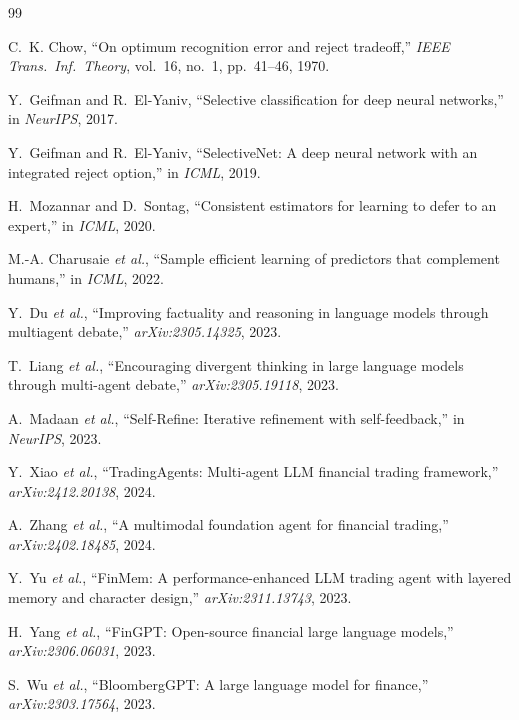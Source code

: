 \documentclass[conference]{IEEEtran}
\begin{document}
\begin{thebibliography}{99}\footnotesize

C.~K. Chow,
``On optimum recognition error and reject tradeoff,''
\emph{IEEE Trans.\ Inf.\ Theory}, vol.~16, no.~1, pp.~41--46, 1970.

Y.~Geifman and R.~El-Yaniv,
``Selective classification for deep neural networks,''
in \emph{NeurIPS}, 2017.

Y.~Geifman and R.~El-Yaniv,
``SelectiveNet: A deep neural network with an integrated reject option,''
in \emph{ICML}, 2019.

H.~Mozannar and D.~Sontag,
``Consistent estimators for learning to defer to an expert,''
in \emph{ICML}, 2020.

M.-A. Charusaie \emph{et al.},
``Sample efficient learning of predictors that complement humans,''
in \emph{ICML}, 2022.

Y.~Du \emph{et al.},
``Improving factuality and reasoning in language models through
multiagent debate,''
\emph{arXiv:2305.14325}, 2023.

T.~Liang \emph{et al.},
``Encouraging divergent thinking in large language models through
multi-agent debate,''
\emph{arXiv:2305.19118}, 2023.

A.~Madaan \emph{et al.},
``Self-Refine: Iterative refinement with self-feedback,''
in \emph{NeurIPS}, 2023.

Y.~Xiao \emph{et al.},
``TradingAgents: Multi-agent LLM financial trading framework,''
\emph{arXiv:2412.20138}, 2024.

A.~Zhang \emph{et al.},
``A multimodal foundation agent for financial trading,''
\emph{arXiv:2402.18485}, 2024.

Y.~Yu \emph{et al.},
``FinMem: A performance-enhanced LLM trading agent with layered
memory and character design,''
\emph{arXiv:2311.13743}, 2023.

H.~Yang \emph{et al.},
``FinGPT: Open-source financial large language models,''
\emph{arXiv:2306.06031}, 2023.

S.~Wu \emph{et al.},
``BloombergGPT: A large language model for finance,''
\emph{arXiv:2303.17564}, 2023.


\end{thebibliography}
\end{document}
